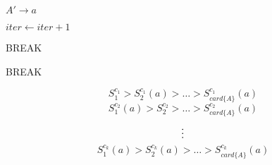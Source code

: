 \documentclass[a4paper,12pt]{article}
\begin{document}
\newline
\begin{algorithmic}
\item{$A' \rightarrow a$}
\item{$iter \leftarrow iter +1$}
\item{BREAK}
\ENDIF
\ENDIF
\ENDFOR
{}
\item{BREAK}
\ENDIF
\ENDFOR
{}
\end{algorithmic}
%
$$
S^{c_1}_1 >S^{c_1}_2(a)  > \ldots  > S^{c_1}_{card\{A\}}(a)$$\newline
$$
S^{c_2}_1(a)  >S^{c_2}_2 >\ldots >S^{c_2}_{card\{A\}}(a)$$\newline
 $$\vdots\\$$\newline
$$S^{c_k}_1(a)  >S^{c_k}_2(a)  >\ldots  >S^{c_k}_{card\{A\}}(a)$$
\end{document}
